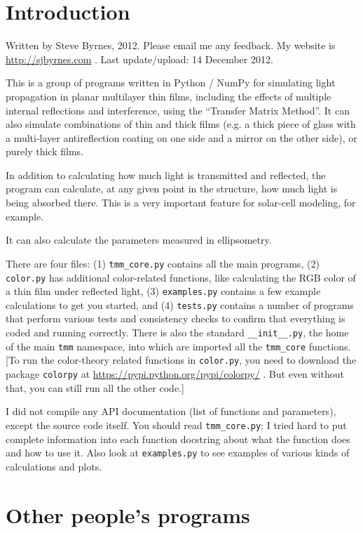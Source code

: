 \documentclass[12pt]{article}
\renewcommand{\(}{\left(}
\renewcommand{\)}{\right)}
\begin{document}
\section{Introduction}

Written by Steve Byrnes, 2012. Please email me any feedback. My website is \url{http://sjbyrnes.com} . Last update/upload: 14 December 2012.

This is a group of programs written in Python / NumPy for simulating light propagation in planar multilayer thin films, including the effects of multiple internal reflections and interference, using the ``Transfer Matrix Method''. It can also simulate combinations of thin and thick films (e.g. a thick piece of glass with a multi-layer antireflection coating on one side and a mirror on the other side), or purely thick films.

In addition to calculating how much light is transmitted and reflected, the program can calculate, at any given point in the structure, how much light is being absorbed there. This is a very important feature for solar-cell modeling, for example.

It can also calculate the parameters measured in ellipsometry.

There are four files: (1) \verb=tmm_core.py= contains all the main programs, (2) \verb=color.py= has additional color-related functions, like calculating the RGB color of a thin film under reflected light, (3) \verb=examples.py= contains a few example calculations to get you started, and (4) \verb=tests.py= contains a number of programs that perform various tests and consistency checks to confirm that everything is coded and running correctly. There is also the standard \verb=__init__.py=, the home of the main \verb=tmm= namespace, into which are imported all the \verb=tmm_core= functions. [To run the color-theory related functions in \verb=color.py=, you need to download the package \verb=colorpy= at \url{https://pypi.python.org/pypi/colorpy/} . But even without that, you can still run all the other code.]

I did not compile any API documentation (list of functions and parameters), except the source code itself. You should read \verb=tmm_core.py=: I tried hard to put complete information into each function docstring about what the function does and how to use it. Also look at \verb=examples.py= to see examples of various kinds of calculations and plots.

\section{Other people's programs}
\end{document}
